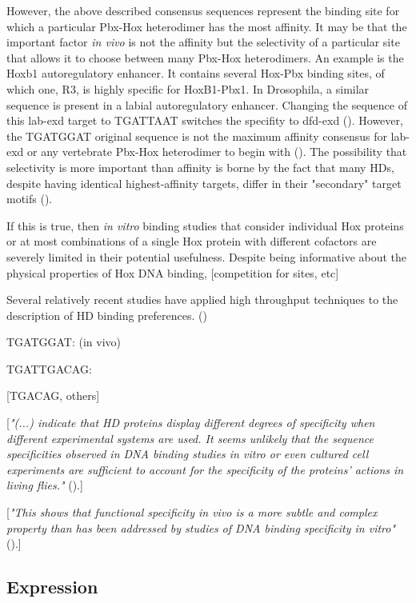 However, the above described consensus sequences represent the binding site for which a particular Pbx-Hox heterodimer has the most affinity. It may be that the important factor \textit{in vivo} is not the affinity but the selectivity of a particular site that allows it to choose between many Pbx-Hox heterodimers. An example is the Hoxb1 autoregulatory enhancer. It contains several Hox-Pbx binding sites, of which one, R3, is highly specific for HoxB1-Pbx1. In Drosophila, a similar sequence is present in a labial autoregulatory enhancer. Changing the sequence of this lab-\ac{exd} target to TGATTAAT switches the specifity to dfd-\ac{exd} (\cite{Chan1997}). However, the TGATGGAT original sequence is not the maximum affinity consensus for lab-\ac{exd} or any vertebrate Pbx-Hox heterodimer to begin with (\cite{Mann1998,Shen1997}). The possibility that selectivity is more important than affinity is borne by the fact that many \acp{HD}, despite having identical highest-affinity targets, differ in their "secondary" target motifs (\cite{Berger2008}).

If this is true, then \textit{in vitro} binding studies that consider individual Hox proteins or at most combinations of a single Hox protein with different cofactors are severely limited in their potential usefulness. Despite being informative about the physical properties of Hox DNA binding, [competition for sites, etc]
		
Several relatively recent studies have applied high throughput techniques to the description of \ac{HD} binding preferences. (\cite{Slattery2011,Berger2008,Noyes2008})
		
TGATGGAT: \cite{Poepperl1995,Chan1997} (in vivo)

TGATTGACAG: \cite{Knoepfler1997}

[TGACAG, others]

[\textit{"(...) indicate that \ac{HD} proteins display different degrees of specificity when different experimental systems are used. It seems unlikely that the sequence specificities observed in DNA binding studies in vitro or even cultured cell experiments are sufficient to account for the specificity of the proteins’ actions in living flies."} (\cite{Hayashi1990}).]

[\textit{"This shows that functional specificity in vivo is a more subtle and complex property than has been addressed by studies of DNA binding specificity in vitro"} (\cite{Treisman1992}).]



\subsection{Expression}
